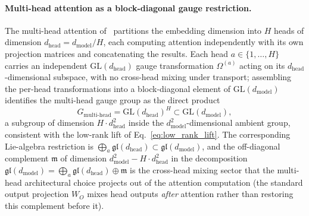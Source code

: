 \paragraph{Multi-head attention as a block-diagonal gauge restriction.}
The multi-head attention of~\cite{vaswani2017attention} partitions the embedding dimension into $H$ heads of dimension $d_{\text{head}} = d_{\text{model}}/H$, each computing attention independently with its own projection matrices and concatenating the results. Each head $a \in \{1,\ldots,H\}$ carries an independent $\mathrm{GL}(d_{\text{head}})$ gauge transformation $\Omega^{(a)}$ acting on its $d_{\text{head}}$-dimensional subspace, with no cross-head mixing under transport; assembling the per-head transformations into a block-diagonal element of $\mathrm{GL}(d_{\text{model}})$ identifies the multi-head gauge group as the direct product
\begin{equation}
G_{\text{multi-head}} = \mathrm{GL}(d_{\text{head}})^H \subset \mathrm{GL}(d_{\text{model}}),
\label{eq:multihead_gauge_group}
\end{equation}
a subgroup of dimension $H \cdot d_{\text{head}}^2$ inside the $d_{\text{model}}^2$-dimensional ambient group, consistent with the low-rank lift of Eq.~\eqref{eq:low_rank_lift}. The corresponding Lie-algebra restriction is $\bigoplus_a \mathfrak{gl}(d_{\text{head}}) \subset \mathfrak{gl}(d_{\text{model}})$, and the off-diagonal complement $\mathfrak{m}$ of dimension $d_{\text{model}}^2 - H \cdot d_{\text{head}}^2$ in the decomposition $\mathfrak{gl}(d_{\text{model}}) = \bigoplus_a \mathfrak{gl}(d_{\text{head}}) \oplus \mathfrak{m}$ is the cross-head mixing sector that the multi-head architectural choice projects out of the attention computation (the standard output projection $W_O$ mixes head outputs \emph{after} attention rather than restoring this complement before it).

